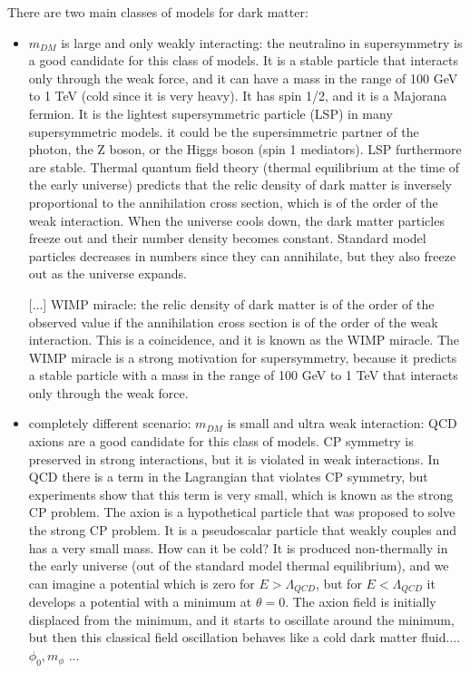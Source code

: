 There are two main classes of models for dark matter:
\begin{itemize}
    \item \(m_{DM} \) is large and only weakly interacting: the neutralino in supersymmetry is a good candidate for this class of models. It is a stable particle that interacts only through the weak force, and it can have a mass in the range of 100 GeV to 1 TeV (cold since it is very heavy). It has spin 1/2, and it is a Majorana fermion. It is the lightest supersymmetric particle (LSP) in many supersymmetric models. it could be the supersimmetric partner of the photon, the Z boson, or the Higgs boson (spin 1 mediators). LSP furthermore are stable. Thermal quantum field theory (thermal equilibrium at the time of the early universe) predicts that the relic density of dark matter is inversely proportional to the annihilation cross section, which is of the order of the weak interaction. When the universe cools down, the dark matter particles freeze out and their number density becomes constant. Standard model particles decreases in numbers since they can annihilate, but they also freeze out as the universe expands.

              [...] WIMP miracle: the relic density of dark matter is of the order of the observed value if the annihilation cross section is of the order of the weak interaction. This is a coincidence, and it is known as the WIMP miracle. The WIMP miracle is a strong motivation for supersymmetry, because it predicts a stable particle with a mass in the range of 100 GeV to 1 TeV that interacts only through the weak force.

    \item completely different scenario: \(m_{DM} \) is small and ultra weak interaction: QCD axions are a good candidate for this class of models. CP symmetry is preserved in strong interactions, but it is violated in weak interactions. In QCD there is a term in the Lagrangian that violates CP symmetry, but experiments show that this term is very small, which is known as the strong CP problem. The axion is a hypothetical particle that was proposed to solve the strong CP problem. It is a pseudoscalar particle that weakly couples and has a very small mass. How can it be cold? It is produced non-thermally in the early universe (out of the standard model thermal equilibrium), and we can imagine a potential which is zero for \(E>\Lambda_{QCD}\), but for \(E<\Lambda_{QCD}\) it develops a potential with a minimum at \(\theta = 0\). The axion field is initially displaced from the minimum, and it starts to oscillate around the minimum, but then this classical field oscillation behaves like a cold dark matter fluid.... \(\phi_0, m_{\phi} \) ...
\end{itemize}